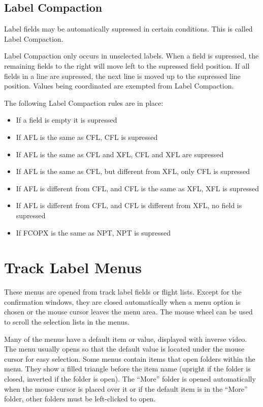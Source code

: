 \documentclass[a4paper,oneside,11pt]{memoir}
\begin{document}
\subsection{Label Compaction}
\label{tlabel:comp}

Label fields may be automatically supressed in certain conditions. This is called Label Compaction.

Label Compaction only occurs in unselected labels. When a field is supressed, the remaining fields to the right will move left to the supressed field position. If all fields in a line are supressed, the next line is moved up to the supressed line position. Values being coordinated are exempted from Label Compaction.

\bigskip

The following Label Compaction rules are in place:

\begin{itemize}
  \item If a field is empty it is supressed
  \item If AFL is the same as CFL, CFL is supressed
  \item If AFL is the same as CFL and XFL, CFL and XFL are supressed
  \item If AFL is the same as CFL, but different from XFL, only CFL is supressed
  \item If AFL is different from CFL, and CFL is the same as XFL, XFL is supressed
  \item If AFL is different from CFL, and CFL is different from XFL, no field is supressed
  \item If FCOPX is the same as NPT, NPT is supressed
\end{itemize}

\section{Track Label Menus}

These menus are opened from track label fields or flight lists. Except for the confirmation windows, they are closed automatically when a menu option is chosen or the mouse cursor leaves the menu area. The mouse wheel can be used to scroll the selection lists in the menus.

\bigskip

Many of the menus have a default item or value, displayed with inverse video. The menu usually opens so that the default value is located under the mouse cursor for easy selection. Some menus contain items that open folders within the menu. They show a filled triangle before the item name (upright if the folder is closed, inverted if the folder is open). The “More” folder is opened automatically when the mouse cursor is placed over it or if the default item is in the “More” folder, other folders must be left-clicked to open.
\end{document}
